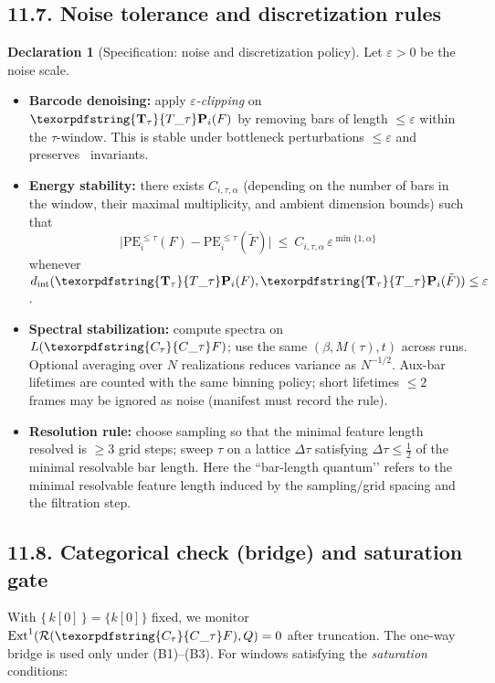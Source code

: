 \documentclass[11pt]{article}
\numberwithin{equation}{section}
\theoremstyle{plain}
\theoremstyle{definition}
\theoremstyle{remark}
\DeclareMathOperator{\Ext}{Ext}
\newcommand{\Rfun}{\mathcal{R}}
\theoremstyle{plain}
\theoremstyle{definition}
\numberwithin{equation}{section}
\theoremstyle{definition}
\newtheorem{declaration}[theorem]{Declaration}
\DeclareRobustCommand{\Ttau}{\texorpdfstring{\ensuremath{\mathbf{T}_{\tau}}}{T\_\tau}}
\DeclareRobustCommand{\Ctau}{\texorpdfstring{\ensuremath{C_{\tau}}}{C\_\tau}}
\DeclareRobustCommand{\fqi}{\text{f.q.i.}}
\DeclareRobustCommand{\Qtest}{\{\,k[0]\,\}}
\numberwithin{equation}{section}
\theoremstyle{plain}
\theoremstyle{definition}
\theoremstyle{remark}
\providecommand{\Cfun}[1]{\mathsf{C}_{#1}}
\providecommand{\Tfun}[1]{\mathbf{T}_{#1}}
\providecommand{\Ctau}{\Cfun{\tau}}
\providecommand{\Ttau}{\Tfun{\tau}}
\begin{document}
\subsection*{11.7. Noise tolerance and discretization rules}
\begin{declaration}[Specification: noise and discretization policy]\label{spec:11-noise}
Let $\varepsilon>0$ be the noise scale.
\begin{itemize}
  \item \textbf{Barcode denoising:} apply \emph{$\varepsilon$-clipping} on $\Ttau\mathbf{P}_i(F)$ by removing bars of length $\le \varepsilon$ within the $\tau$-window. This is stable under bottleneck perturbations $\le \varepsilon$ and preserves \fqi\ invariants.
  \item \textbf{Energy stability:} there exists $C_{i,\tau,\alpha}$ (depending on the number of bars in the window, their maximal multiplicity, and ambient dimension bounds) such that
  \[
    \big|\mathrm{PE}_{i}^{\le \tau}(F)-\mathrm{PE}_{i}^{\le \tau}(\tilde F)\big|\ \le\ C_{i,\tau,\alpha}\,\varepsilon^{\min\{1,\alpha\}}
  \]
  whenever $d_{\mathrm{int}}(\Ttau\mathbf{P}_i(F),\Ttau\mathbf{P}_i(\tilde F))\le \varepsilon$.
  \item \textbf{Spectral stabilization:} compute spectra on $L(\Ctau F)$; use the same $(\beta,M(\tau),t)$ across runs. Optional averaging over $N$ realizations reduces variance as $N^{-1/2}$. Aux-bar lifetimes are counted with the same binning policy; short lifetimes $\le 2$ frames may be ignored as noise (manifest must record the rule).
  \item \textbf{Resolution rule:} choose sampling so that the minimal feature length resolved is $\ge 3$ grid steps; sweep $\tau$ on a lattice $\Delta\tau$ satisfying $\Delta\tau\le \tfrac{1}{2}$ of the minimal resolvable bar length. Here the “bar-length quantum’’ refers to the minimal resolvable feature length induced by the sampling/grid spacing and the filtration step.
\end{itemize}
\end{declaration}

\subsection*{11.8. Categorical check (bridge) and saturation gate}
With $\Qtest=\{k[0]\}$ fixed, we monitor $\Ext^1(\Rfun(\Ctau F),Q)=0$ after truncation. The one-way bridge is used only under (B1)–(B3). For windows satisfying the \emph{saturation} conditions:
\end{document}
